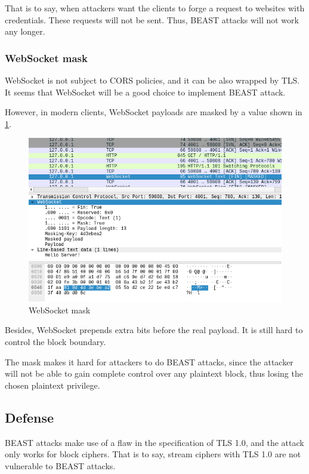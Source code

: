 \documentclass{acm_proc_article-sp}
\begin{document}
That is to say, when attackers want the clients to forge a request to websites with
credentials. These requests will not be sent. Thus, BEAST attacks will not work
any longer.

\subsubsection{WebSocket mask}
WebSocket is not subject to CORS policies, and it can be also wrapped by TLS.
It seems that WebSocket will be a good choice to implement BEAST attack.

However, in modern clients, WebSocket payloads are masked\cite{mask} by a value shown in \ref{fig:websocket-mask}.

\begin{figure}[htb]
    \centering
    \includegraphics[keepaspectratio, width=\linewidth]{./figures/websocket-mask.png}
    \caption{WebSocket mask}
    \label{fig:websocket-mask}
\end{figure}

Besides, WebSocket prepends extra bits before the real payload. It is still hard to
control the block boundary.

The mask makes it hard for attackers to do BEAST attacks, since the attacker will not be able to
gain complete control over any plaintext block, thus losing the chosen plaintext privilege.

\subsection{Defense}
BEAST attacks make use of a flaw in the specification of TLS 1.0, and the attack only
works for block ciphers. That is to say, stream ciphers with TLS 1.0 are not
vulnerable to BEAST attacks.
\end{document}
